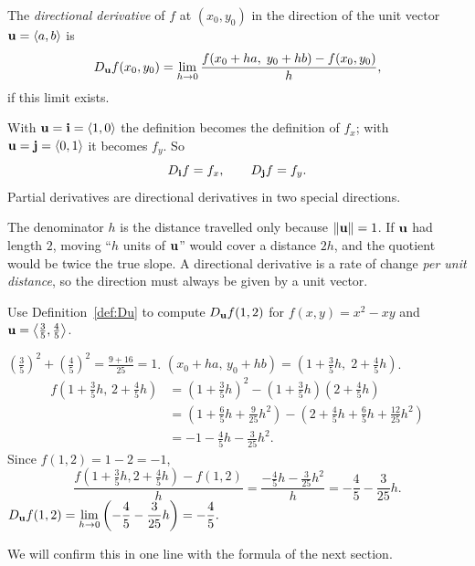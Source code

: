 \begin{definition}\label{def:Du}
The \emph{directional derivative} of $f$ at $(x_0,y_0)$ in the direction of the
unit vector $\mathbf{u}=\left\langle a,b \right\rangle$ is
\[
  D_{\mathbf{u}} f(x_0,y_0)=\lim_{h\to0}\frac{f(x_0+ha,\;y_0+hb)-f(x_0,y_0)}{h},
\]
if this limit exists.
\end{definition}

\begin{remark}\label{rem:special}
With $\mathbf{u}=\mathbf{i}=\left\langle 1,0 \right\rangle$ the definition becomes the definition of $f_x$; with
$\mathbf{u}=\mathbf{j}=\left\langle 0,1 \right\rangle$ it becomes $f_y$. So
\[
  D_{\mathbf{i}}f=f_x,\qquad D_{\mathbf{j}}f=f_y .
\]
Partial derivatives are directional derivatives in two special directions.
\end{remark}

\begin{remark}
The denominator $h$ is the distance travelled only because $\lVert\mathbf{u}\rVert=1$. If
$\mathbf{u}$ had length $2$, moving ``$h$ units of $\mathbf{u}$'' would cover a distance $2h$,
and the quotient would be twice the true slope. A directional derivative is a
rate of change \emph{per unit distance}, so the direction must always be
given by a unit vector.
\end{remark}

\begin{example}\label{ex:by-def}
Use Definition~\ref{def:Du} to compute $D_{\mathbf{u}} f(1,2)$ for $f(x,y)=x^2-xy$ and
$\mathbf{u}=\left\langle \tfrac35,\tfrac45 \right\rangle$.
\end{example}
\begin{solution}
 $\left(\frac35\right)^2+\left(\frac45\right)^2=\frac{9+16}{25}=1$.\checkok
{} $(x_0+ha,\,y_0+hb)=\left(1+\tfrac35h,\;2+\tfrac45h\right)$.
\begin{align*}
f\!\left(1+\tfrac35h,\,2+\tfrac45h\right)
&=\left(1+\tfrac35h\right)^2-\left(1+\tfrac35h\right)\left(2+\tfrac45h\right)\\
&=\left(1+\tfrac65h+\tfrac{9}{25}h^2\right)-\left(2+\tfrac45h+\tfrac65h+\tfrac{12}{25}h^2\right)\\
&=-1-\tfrac45h-\tfrac{3}{25}h^2 .
\end{align*}
 Since $f(1,2)=1-2=-1$,
\[
\frac{f(1+\frac35h,2+\frac45h)-f(1,2)}{h}=\frac{-\frac45h-\frac{3}{25}h^2}{h}=-\frac45-\frac{3}{25}h .
\]
 $D_{\mathbf{u}} f(1,2)=\displaystyle\lim_{h\to0}\left(-\frac45-\frac{3}{25}h\right)=-\frac45.$

We will confirm this in one line with the formula of the next section.
\end{solution}

